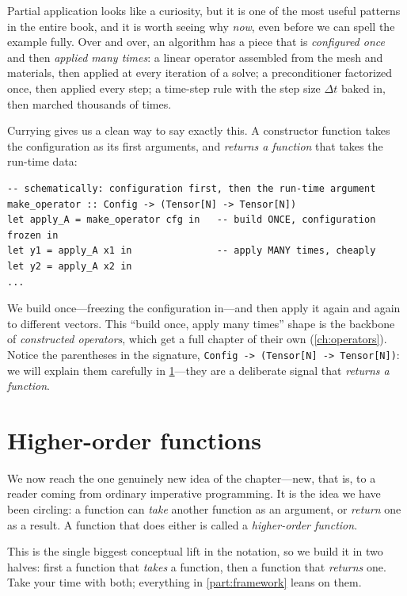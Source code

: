 Partial application looks like a curiosity, but it is one of the most useful
patterns in the entire book, and it is worth seeing why \emph{now}, even before we
can spell the example fully. Over and over, an algorithm has a piece that is
\emph{configured once} and then \emph{applied many times}: a linear operator
assembled from the mesh and materials, then applied at every iteration of a solve;
a preconditioner factorized once, then applied every step; a time-step rule with
the step size $\Delta t$ baked in, then marched thousands of times.

Currying gives us a clean way to say exactly this. A constructor function takes
the configuration as its first arguments, and \emph{returns a function} that takes
the run-time data:

\begin{lstlisting}[style=l4style]
-- schematically: configuration first, then the run-time argument
make_operator :: Config -> (Tensor[N] -> Tensor[N])
let apply_A = make_operator cfg in   -- build ONCE, configuration frozen in
let y1 = apply_A x1 in               -- apply MANY times, cheaply
let y2 = apply_A x2 in
...
\end{lstlisting}

\noindent We build  once---freezing the configuration 
in---and then apply it again and again to different vectors. This ``build once,
apply many times'' shape is the backbone of \emph{constructed operators}, which
get a full chapter of their own (\cref{ch:operators}). Notice the parentheses in
the signature, \lstinline[style=l4style]|Config -> (Tensor[N] -> Tensor[N])|: we
will explain them carefully in \cref{sec:higherorder}---they are a deliberate
signal that  \emph{returns a function}.

\section{Higher-order functions}
\label{sec:higherorder}

We now reach the one genuinely new idea of the chapter---new, that is, to a reader
coming from ordinary imperative programming. It is the idea we have been circling:
a function can \emph{take} another function as an argument, or \emph{return} one as
a result. A function that does either is called a \emph{higher-order function}.

This is the single biggest conceptual lift in the notation, so we build it in two
halves: first a function that \emph{takes} a function, then a function that
\emph{returns} one. Take your time with both; everything in \cref{part:framework}
leans on them.


